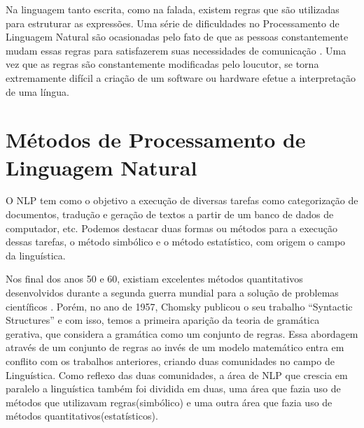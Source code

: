 Na linguagem tanto escrita, como na falada, existem regras que são utilizadas
para estruturar as expressões. Uma série de dificuldades no Processamento de
Linguagem Natural são ocasionadas pelo fato de que as pessoas constantemente
mudam essas regras para satisfazerem suas necessidades de comunicação
\cite{manningschutze1999}. Uma vez que as regras são constantemente modificadas pelo loucutor, se torna extremamente difícil a criação de um software ou hardware efetue a interpretação de uma língua. 


% 
% 
% 

\section{Métodos de Processamento de Linguagem Natural}

O \ac{NLP} tem como o objetivo a execução de diversas tarefas como categorização
de documentos, tradução e geração de textos a partir de um banco de dados de
computador, etc. Podemos destacar duas formas ou métodos para a execução dessas
tarefas, o método simbólico e o método estatístico, com origem o campo da linguística. 

Nos final dos anos 50 e 60, existiam excelentes métodos quantitativos
desenvolvidos durante a segunda guerra mundial para a solução de problemas
científicos \cite{shannon48}.
Porém, no ano de 1957, Chomsky publicou o seu trabalho ``Syntactic Structures''
e com isso, temos a primeira aparição da teoria de gramática gerativa, que
considera a gramática como um conjunto de regras. Essa abordagem através de um
conjunto de regras ao invés de um modelo matemático entra em conflito com os
trabalhos anteriores, criando duas comunidades no campo de Linguística. Como
reflexo das duas comunidades, a área de \ac{NLP} que crescia em paralelo a
linguística também foi dividida em duas, uma área que fazia uso de métodos que
utilizavam regras(simbólico) e uma outra área que fazia uso de métodos
quantitativos(estatísticos).



